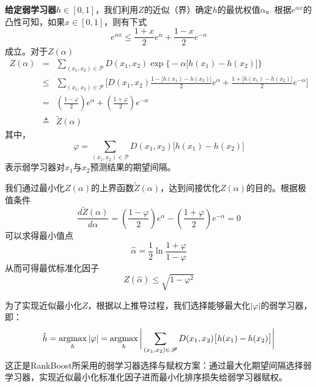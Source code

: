 \textbf{给定弱学习器$h\in [0,1]$}，我们利用$Z$的近似（界）确定$h$的最优权值$\alpha$。根据$e^{\alpha x}$的凸性可知，如果$x\in[0,1]$，则有下式
\begin{equation}
    e^{\alpha x} \le \frac{1 + x}{2} e^{\alpha} + \frac{1 - x}{2} e^{-\alpha}
\end{equation}
成立。对于$Z(\alpha)$
\begin{equation}
    \begin{array}{lll}
      Z(\alpha) & = & \sum\limits_{(x_1,x_2)\in \mathscr P} D(x_1,x_2) \exp\big\{-\alpha \big[h(x_1) - h(x_2)\big]\big\} \\
       & \le & \sum\limits_{(x_1,x_2)\in \mathscr P} \bigg[D(x_1,x_2) \frac{1 - \big[h(x_1) - h(x_2)\big]}{2} e^{\alpha} + \frac{1 + \big[h(x_1) - h(x_2)\big]}{2} e^{-\alpha}\bigg] \\
       & = & (\frac{1 - \varphi}{2}) e^{\alpha} + (\frac{1 + \varphi}{2}) e^{-\alpha} \\
       & \triangleq & \widetilde{Z}(\alpha)
    \end{array}
\end{equation}
其中，
\begin{equation}
    \varphi = \sum\limits_{(x_1,x_2)\in \mathscr P} D(x_1,x_2) \big[h(x_1) - h(x_2)\big]
\end{equation}
表示弱学习器对$x_1$与$x_2$预测结果的期望间隔。

我们通过最小化$Z(\alpha)$的上界函数$\widetilde{Z}(\alpha)$，达到间接优化$Z(\alpha)$的目的。根据极值条件
\begin{equation}
    \frac{d\widetilde{Z}(\alpha)}{d\alpha} = (\frac{1 - \varphi}{2}) e^{\alpha} - (\frac{1 + \varphi}{2}) e^{-\alpha} = 0
\end{equation}
可以求得最小值点
\begin{equation}
    \hat\alpha = \frac{1}{2} \ln \frac{1+\varphi}{1-\varphi}
\end{equation}
从而可得最优标准化因子
\begin{equation}
    Z(\hat\alpha) \le \sqrt{1-\varphi^2}
\end{equation}

为了实现近似最小化$Z$，根据以上推导过程，我们选择能够最大化$|\varphi|$的弱学习器，即：
\begin{equation}\label{eq:optimalweakselect}
    \hat h = \operatorname*{\mathrm{\arg\!\max}}_{h} |\varphi| = \operatorname*{\mathrm{\arg\!\max}}\limits_{h} \bigg|\sum\limits_{(x_1,x_2)\in \mathscr P} D(x_1,x_2) \big[h(x_1) - h(x_2)\big]\bigg|
\end{equation}
这正是RankBoost所采用的弱学习器选择与赋权方案：通过最大化期望间隔选择弱学习器，实现近似最小化标准化因子进而最小化排序损失给弱学习器赋权。

